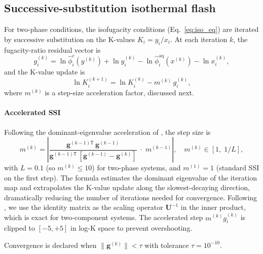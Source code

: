 \documentclass[preprint,12pt,number]{elsarticle}
\begin{document}
\subsection{Successive-substitution isothermal flash}
\label{sec:ssi}

For two-phase conditions, the isofugacity conditions (Eq.~\eqref{eq:iso_eq})
are iterated by successive substitution on the K-values $K_i = y_i / x_i$.  At each iteration $k$, the fugacity-ratio residual vector is
\begin{equation}
  g_i^{(k)} = \ln\hat{\phi}_i^c(y^{(k)}) + \ln y_i^{(k)}
             - \ln\hat{\phi}_i^{\text{aq}}(x^{(k)}) - \ln x_i^{(k)},
  \label{eq:lng}
\end{equation}
and the K-value update is
\begin{equation}
  \ln K_i^{(k+1)} = \ln K_i^{(k)} - m^{(k)}\, g_i^{(k)},
  \label{eq:ssi}
\end{equation}
where $m^{(k)}$ is a step-size acceleration factor, discussed next.

\paragraph{Accelerated SSI}
Following the dominant-eigenvalue acceleration of \citet{Jex2024}, the step size is
\begin{equation}
  m^{(k)} = \left| \frac{\mathbf{g}^{(k-1)\mathsf{T}}\, \mathbf{g}^{(k-1)}}
                   {\mathbf{g}^{(k-1)\mathsf{T}}\,[\mathbf{g}^{(k-1)} - \mathbf{g}^{(k)}]}
             \;\cdot\; m^{(k-1)} \right|, \quad
  m^{(k)} \in [1,\; 1/L],
  \label{eq:accel_m}
\end{equation}
with $L = 0.1$ (so $m^{(k)} \leq 10$) for two-phase systems, and $m^{(1)} = 1$
(standard SSI on the first step).
The formula estimates the dominant eigenvalue of the iteration map and extrapolates
the K-value update along the slowest-decaying direction, dramatically reducing the
number of iterations needed for convergence.
Following \citet{Jex2024}, we use the identity matrix as the scaling operator
$\mathbf{U}^{-1}$ in the inner product, which is exact for two-component systems.
The accelerated step $m^{(k)} g_i^{(k)}$ is clipped to $[-5, +5]$ in log-K space
to prevent overshooting.

Convergence is declared when $\|\mathbf{g}^{(k)}\| < \tau$ with tolerance $\tau = 10^{-10}$.
\end{document}
